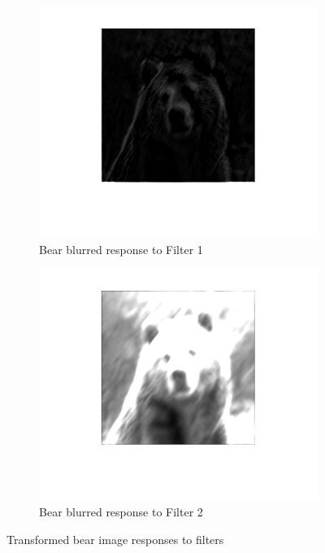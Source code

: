\documentclass[a4paper]{iacas}
\begin{document}
\begin{figure}
  \begin{subfigure}{0.4\linewidth}
	\includegraphics[width=\linewidth]{imgs/bear_blurred_filtered_1.png}
	\caption{Bear blurred response to Filter 1}
  \end{subfigure}
  \begin{subfigure}{0.4\linewidth}
	\includegraphics[width=\linewidth]{imgs/bear_blurred_filtered_2.png}
	\caption{Bear blurred response to Filter 2}
  \end{subfigure}


\caption{Transformed bear image responses to filters}
\label{Filters_responses}
\end{figure}
\vskip 0.1in
\end{document}
